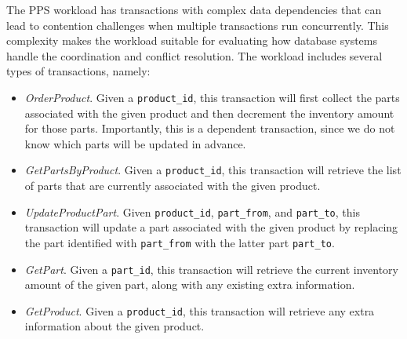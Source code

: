 The PPS workload has transactions with complex data dependencies that can lead to contention challenges when multiple transactions run concurrently. This complexity makes the workload suitable for evaluating how database systems handle the coordination and conflict resolution. The workload includes several types of transactions, namely:
\begin{itemize}
    \item \textit{OrderProduct}. Given a \texttt{product\_id}, this transaction will first collect the parts associated with the given product and then decrement the inventory amount for those parts. Importantly, this is a dependent transaction, since we do not know which parts will be updated in advance.
    \item \textit{GetPartsByProduct}. Given a \texttt{product\_id}, this transaction will retrieve the list of parts that are currently associated with the given product.
    \item \textit{UpdateProductPart}. Given \texttt{product\_id}, \texttt{part\_from}, and \texttt{part\_to}, this transaction will update a part associated with the given product by replacing the part identified with \texttt{part\_from} with the latter part \texttt{part\_to}.
    \item \textit{GetPart}. Given a \texttt{part\_id}, this transaction will retrieve the current inventory amount of the given part, along with any existing extra information.
    \item \textit{GetProduct}. Given a \texttt{product\_id}, this transaction will retrieve any extra information about the given product.
\end{itemize}